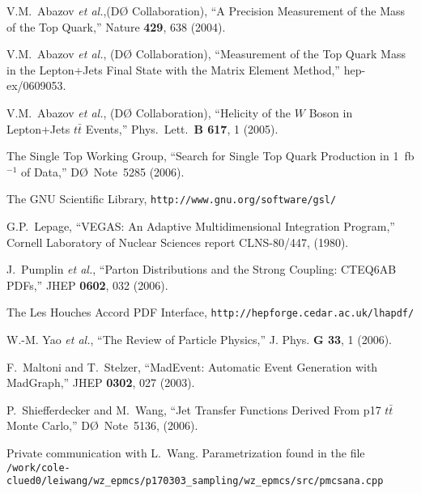 \documentclass[aps]{revtex4}
\newcommand{\dzero}     {D\O}
\newcommand{\ttbar}     {\mbox{$t\bar{t}$}}
\begin{document}
\begin{thebibliography}{99.}
\label{bibliography}
\vspace{-0.15in}

V.M.~Abazov {\it et al.},({\dzero} Collaboration),
``A Precision Measurement of the Mass of the Top Quark,''
Nature {\bf 429}, 638 (2004).

V.M.~Abazov {\it et al.}, ({\dzero} Collaboration),
``Measurement of the Top Quark Mass in the Lepton+Jets Final State
with the Matrix Element Method,''
hep-ex/0609053.

V.M.~Abazov {\it et al.}, ({\dzero} Collaboration),
``Helicity of the $W$ Boson in Lepton+Jets ${\ttbar}$ Events,''
Phys.\ Lett.\ {\bf B 617}, 1 (2005).

The Single Top Working Group,
``Search for Single Top Quark Production in 1~fb$^{-1}$ of Data,''
{\dzero}~Note~5285 (2006).

The GNU Scientific Library,
\texttt{http://www.gnu.org/software/gsl/}

G.P.~Lepage,
``VEGAS: An Adaptive Multidimensional Integration Program,''
Cornell Laboratory of Nuclear Sciences report CLNS-80/447, (1980).

J.~Pumplin {\it et al.},
``Parton Distributions and the Strong Coupling: CTEQ6AB PDFs,''
JHEP {\bf 0602}, 032 (2006).

The Les Houches Accord PDF Interface,
\texttt{http://hepforge.cedar.ac.uk/lhapdf/}

W.-M. Yao {\it et al.},
``The Review of Particle Physics,''
J. Phys. {\bf G 33}, 1 (2006).

F.~Maltoni and T.~Stelzer,
``MadEvent: Automatic Event Generation with MadGraph,''
JHEP {\bf 0302}, 027 (2003).

P.~Shiefferdecker and M.~Wang,
``Jet Transfer Functions Derived From p17 $\ttbar$ Monte Carlo,''
{\dzero}~Note~5136, (2006).

Private communication with L.~Wang.
Parametrization found in the file\\
\texttt{/work/cole-clued0/leiwang/wz\_epmcs/p170303\_sampling/wz\_epmcs/src/pmcsana.cpp}


\end{thebibliography}
\end{document}
